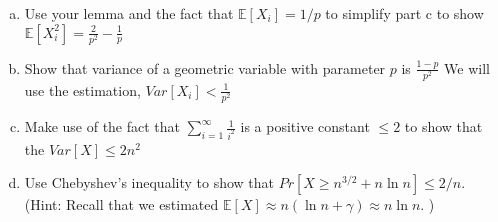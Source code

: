 \documentclass[11pt]{article}
\newif\ifsolutions
\begin{document}
\begin{enumerate}
\begin{enumerate}[a)]
\ifsolutions{\color{blue}{
By definition $\mathbb{E}[X_i^2] = \sum\nolimits_{k=1}^{\infty} k^2p(1-p)^{k-1}$ since $k^2 = k(k+1) - k$ we plug that in to get the answer 
}}\fi



\item Use your lemma and the fact that $\mathbb{E}[X_i] = 1/p$ to simplify part c to show $\mathbb{E}[X_i^2] = \frac{2}{p^2} - \frac{1}{p} $
\ifsolutions{\color{blue}{
We simply plug in our lemma to the left hand term. We also notice that the right hand expression is the expectation of a geometric variable with parameter $p$.
}}\fi
\item Show that variance of a geometric variable with parameter $p$ is $\frac{1-p}{p^2}$ We will use the estimation, $Var[X_i] < \frac{1}{p^2}$
\ifsolutions{\color{blue}{
$Var[X] = \mathbb{E}[X^2] - \mathbb{E}[X]^2$ \\ $Var[X_i] = \frac{2}{p^2} - \frac{1}{p}  - \frac{1}{p}^2 = 1/p^2 - 1/p = \frac{1-p}{p^2} < \frac{1}{p^2}$
}}\fi
\item Make use of the fact that $\sum\nolimits_{i=1}^{\infty} \frac{1}{i^2}$ is a positive constant $\leq2$ to show that the $Var[X] \leq 2n^2$ 

\ifsolutions{\color{blue}{
We use the fact that since the $X_i$ are independent, \\ $Var[X] = \sum\nolimits_{i=0}^{n-1} Var[X_i]$ \\ $ \leq \sum\nolimits_{i=0}^{n-1} (\frac{n}{n-i})^2 = n^2\sum\nolimits_{i=0}^{n-1} \frac{1}{i}^2 \leq n^2\sum\nolimits_{i=0}^{\infty} \frac{1}{i}^2 \leq 2n^2$
}}\fi
\item Use Chebyshev's inequality to show that $Pr[ X \geq n^{3/2} + n \ln{n}] \leq 2/n $. (Hint: Recall that we estimated $\mathbb{E}[X] \approx n(\ln{n} + \gamma) \approx n \ln{n}$. )

\ifsolutions{\color{blue}{
$Pr[ X \geq n^{3/2} + n\ln{n}] \approx Pr[ X \geq n^{3/2} + \mathbb{E}[X]] \\ =  Pr[ X - \mathbb{E}[X] \geq n^{3/2} ] \leq Pr[ | X - \mathbb{E}[X] | \geq n^{3/2} ] \leq \frac{Var[X]}{n^3} \leq \frac{2n^2}{n^3} = 2/n$
}}\fi


\end{enumerate}


\end{enumerate}
\end{document}
